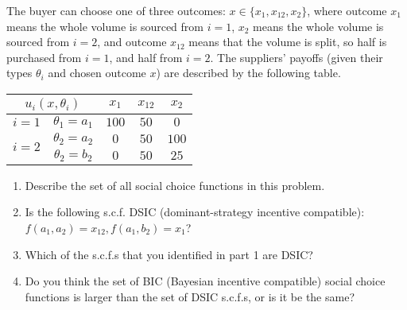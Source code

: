 \documentclass[a4paper]{article}
\newif\ifsolutions
\begin{document}
The buyer can choose one of three outcomes: $x \in \{x_1, x_{12}, x_2\}$, where outcome $x_1$ means the whole volume is sourced from $i=1$, $x_2$ means the whole volume is sourced from $i=2$, and outcome $x_{12}$ means that the volume is split, so half is purchased from $i=1$, and half from $i=2$.
The suppliers' payoffs (given their types $\theta_i$ and chosen outcome $x$) are described by the following table.
\begin{table}[h]
	\centering
	\begin{tabular}{c c|c|c|c}
		\multicolumn{2}{c|}{$u_i(x,\theta_i)$} & $x_1$ & $x_{12}$ & $x_2$
		\\ \hline 
		$i=1$ & $\theta_1 = a_1$ & $100$ & $50$ & $0$
		\\ \hline 
		\multirow{2}{*}{$i=2$} & $\theta_2 = a_2$ & $0$ & $50$ & $100$
		\\ 
		& $\theta_2 = b_2$ & $0$ & $50$ & $25$
	\end{tabular}
\end{table}

\begin{enumerate}
	\item Describe the set of all social choice functions in this problem.
	\item Is the following s.c.f. DSIC (dominant-strategy incentive compatible): $f(a_1,a_2) = x_{12}, f(a_1,b_2) = x_1$?
	\item Which of the s.c.f.s that you identified in part 1 are DSIC? 
	\item Do you think the set of BIC (Bayesian incentive compatible) social choice functions is larger than the set of DSIC s.c.f.s, or is it be the same?
\end{enumerate}

\ifsolutions
\end{document}

